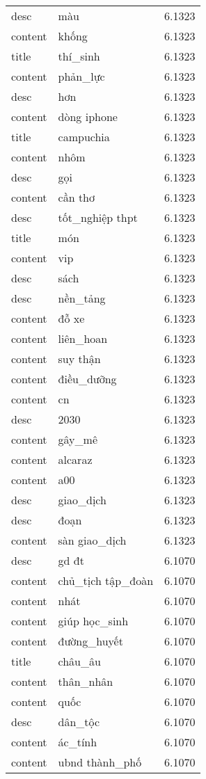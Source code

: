 \documentclass{article}
\begin{document}
\begin{tabular}{lll}
desc & màu & 6.1323\\
content & khống & 6.1323\\
title & thí\_sinh & 6.1323\\
content & phản\_lực & 6.1323\\
desc & hơn & 6.1323\\
content & dòng iphone & 6.1323\\
title & campuchia & 6.1323\\
content & nhôm & 6.1323\\
desc & gọi & 6.1323\\
content & cần thơ & 6.1323\\
desc & tốt\_nghiệp thpt & 6.1323\\
title & món & 6.1323\\
content & vip & 6.1323\\
desc & sách & 6.1323\\
desc & nền\_tảng & 6.1323\\
content & đỗ xe & 6.1323\\
content & liên\_hoan & 6.1323\\
content & suy thận & 6.1323\\
content & điều\_dưỡng & 6.1323\\
content & cn & 6.1323\\
desc & 2030 & 6.1323\\
content & gây\_mê & 6.1323\\
content & alcaraz & 6.1323\\
content & a00 & 6.1323\\
desc & giao\_dịch & 6.1323\\
desc & đoạn & 6.1323\\
content & sàn giao\_dịch & 6.1323\\
desc & gd đt & 6.1070\\
content & chủ\_tịch tập\_đoàn & 6.1070\\
content & nhát & 6.1070\\
content & giúp học\_sinh & 6.1070\\
content & đường\_huyết & 6.1070\\
title & châu\_âu & 6.1070\\
content & thân\_nhân & 6.1070\\
content & quốc & 6.1070\\
desc & dân\_tộc & 6.1070\\
content & ác\_tính & 6.1070\\
content & ubnd thành\_phố & 6.1070\\

\end{tabular}
\end{document}
